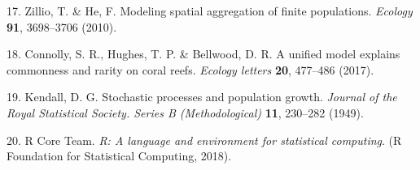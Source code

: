 \documentclass[]{article}
\begin{document}
\hypertarget{ref-zillio2010}{}
17. Zillio, T. \& He, F. Modeling spatial aggregation of finite
populations. \emph{Ecology} \textbf{91}, 3698--3706 (2010).

\hypertarget{ref-connolly2017}{}
18. Connolly, S. R., Hughes, T. P. \& Bellwood, D. R. A unified model
explains commonness and rarity on coral reefs. \emph{Ecology letters}
\textbf{20}, 477--486 (2017).

\hypertarget{ref-kendall1949}{}
19. Kendall, D. G. Stochastic processes and population growth.
\emph{Journal of the Royal Statistical Society. Series B
(Methodological)} \textbf{11}, 230--282 (1949).

\hypertarget{ref-rcore}{}
20. R Core Team. \emph{R: A language and environment for statistical
computing}. (R Foundation for Statistical Computing, 2018).
\end{document}
